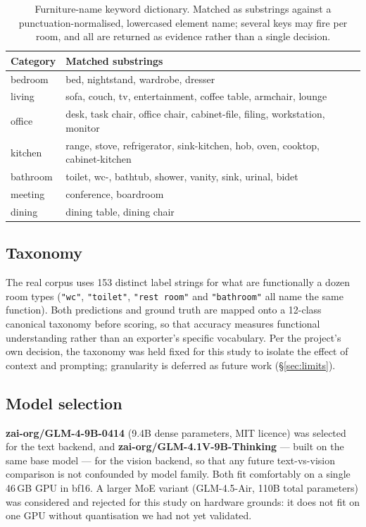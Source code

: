 \documentclass[11pt,a4paper]{article}
\begin{document}
\begin{table}[h]
\centering
\small
\begin{tabular}{@{}lp{9.5cm}@{}}
\toprule
\textbf{Category} & \textbf{Matched substrings} \\
\midrule
bedroom  & bed, nightstand, wardrobe, dresser \\
living   & sofa, couch, tv, entertainment, coffee table, armchair, lounge \\
office   & desk, task chair, office chair, cabinet-file, filing, workstation, monitor \\
kitchen  & range, stove, refrigerator, sink-kitchen, hob, oven, cooktop, cabinet-kitchen \\
bathroom & toilet, wc-, bathtub, shower, vanity, sink, urinal, bidet \\
meeting  & conference, boardroom \\
dining   & dining table, dining chair \\
\bottomrule
\end{tabular}
\caption{Furniture-name keyword dictionary. Matched as substrings against a
punctuation-normalised, lowercased element name; several keys may fire per
room, and all are returned as evidence rather than a single decision.}
\label{tab:keywords}
\end{table}

\subsection{Taxonomy}

The real corpus uses 153 distinct label strings for what are functionally a
dozen room types (\texttt{"wc"}, \texttt{"toilet"}, \texttt{"rest room"} and
\texttt{"bathroom"} all name the same function). Both predictions and ground
truth are mapped onto a 12-class canonical taxonomy before scoring, so that
accuracy measures functional understanding rather than an exporter's specific
vocabulary. Per the project's own decision, the taxonomy was held fixed for
this study to isolate the effect of context and prompting; granularity is
deferred as future work (\S\ref{sec:limits}).

\subsection{Model selection}

\textbf{zai-org/GLM-4-9B-0414} (9.4B dense parameters, MIT licence) was
selected for the text backend, and \textbf{zai-org/GLM-4.1V-9B-Thinking} ---
built on the same base model --- for the vision backend, so that any future
text-vs-vision comparison is not confounded by model family. Both fit
comfortably on a single 46\,GB GPU in bf16. A larger MoE variant
(GLM-4.5-Air, 110B total parameters) was considered and rejected for this
study on hardware grounds: it does not fit on one GPU without quantisation we
had not yet validated.
\end{document}
